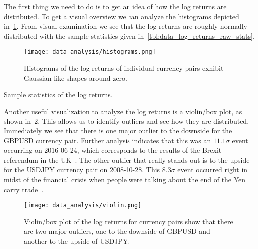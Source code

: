 The first thing we need to do is to get an idea of how the log returns are distributed.
To get a visual overview we can analyze the histograms depicted in~\cref{fig:histograms_raw}.
From visual examination we see that the log returns are roughly normally distributed with the sample statistics given in~\cref{tbl:data_log_returns_raw_stats}.
\begin{figure}[!htb]
    \begin{center}
        \texttt{[image: data\_analysis/histograms.png]}
    \end{center}
    \caption{Histograms of the log returns of individual currency pairs exhibit Gaussian-like shapes around zero.}
    \label{fig:histograms_raw}
\end{figure}

\begin{table}[!htb]
    \centering
    \begin{adjustbox}{max width=\textwidth}
        
    \end{adjustbox}
    \caption{Sample statistics of the log returns.}
    \label{tbl:data_log_returns_raw_stats}
\end{table}

Another useful visualization to analyze the log returns is a violin/box plot, as shown in~\cref{fig:violin_raw}.
This allows us to identify outliers and see how they are distributed.
Immediately we see that there is one major outlier to the downside for the GBPUSD currency pair.
Further analysis indicates that this was an \( 11.1\sigma \) event occurring on 2016-06-24, which corresponds to the results of the Brexit referendum in the UK~\cite{brexit_gov_uk}.
The other outlier that really stands out is to the upside for the USDJPY currency pair on 2008-10-28.
This \( 8.3\sigma \) event occurred right in midst of the financial crisis when people were talking about the end of the Yen carry trade~\cite{jpy_carry_trade_nyt}.
\begin{figure}[!htb]
    \begin{center}
        \texttt{[image: data\_analysis/violin.png]}
    \end{center}
    \caption{Violin/box plot of the log returns for currency pairs show that there are two major outliers, one to the downside of GBPUSD and another to the upside of USDJPY.}
    \label{fig:violin_raw}
\end{figure}

